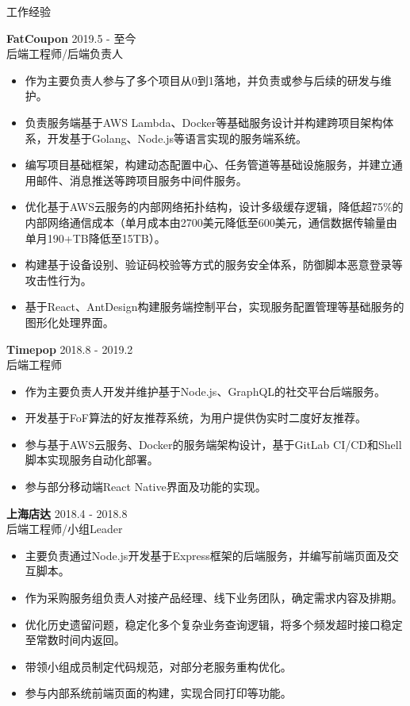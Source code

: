 \documentclass{resume} %
\begin{document}
\begin{rSection}{工作经验}

\textbf{FatCoupon} \hfill 2019.5 - 至今\\
后端工程师/后端负责人 \hfill \textit{}
\begin{itemize}
  \itemsep -3pt {}
  \item 作为主要负责人参与了多个项目从0到1落地，并负责或参与后续的研发与维护。
  \item 负责服务端基于AWS Lambda、Docker等基础服务设计并构建跨项目架构体系，开发基于Golang、Node.js等语言实现的服务端系统。
  \item 编写项目基础框架，构建动态配置中心、任务管道等基础设施服务，并建立通用邮件、消息推送等跨项目服务中间件服务。
  \item 优化基于AWS云服务的内部网络拓扑结构，设计多级缓存逻辑，降低超75\%的内部网络通信成本（单月成本由2700美元降低至600美元，通信数据传输量由单月190+TB降低至15TB）。
  \item 构建基于设备设别、验证码校验等方式的服务安全体系，防御脚本恶意登录等攻击性行为。
  \item 基于React、AntDesign构建服务端控制平台，实现服务配置管理等基础服务的图形化处理界面。
\end{itemize}

\textbf{Timepop} \hfill 2018.8 - 2019.2\\
后端工程师 \hfill \textit{}
\begin{itemize}
  \itemsep -3pt {}
  \item 作为主要负责人开发并维护基于Node.js、GraphQL的社交平台后端服务。
  \item 开发基于FoF算法的好友推荐系统，为用户提供伪实时二度好友推荐。
  \item 参与基于AWS云服务、Docker的服务端架构设计，基于GitLab CI/CD和Shell脚本实现服务自动化部署。
  \item 参与部分移动端React Native界面及功能的实现。
\end{itemize}

\textbf{上海店达} \hfill 2018.4 - 2018.8\\
后端工程师/小组Leader \hfill \textit{}
\begin{itemize}
  \itemsep -3pt {}
  \item 主要负责通过Node.js开发基于Express框架的后端服务，并编写前端页面及交互脚本。
  \item 作为采购服务组负责人对接产品经理、线下业务团队，确定需求内容及排期。
  \item 优化历史遗留问题，稳定化多个复杂业务查询逻辑，将多个频发超时接口稳定至常数时间内返回。
  \item 带领小组成员制定代码规范，对部分老服务重构优化。
  \item 参与内部系统前端页面的构建，实现合同打印等功能。
\end{itemize}


\end{rSection}
\end{document}
